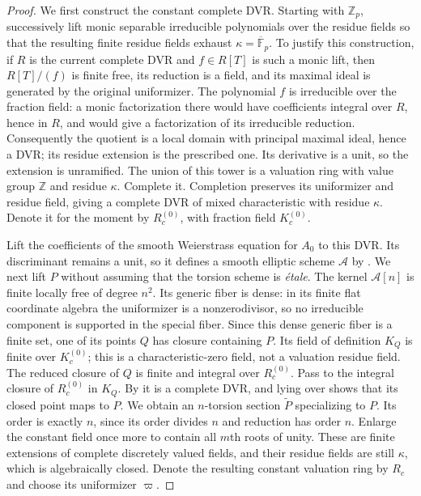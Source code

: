 \begin{proof}
We first construct the constant complete DVR.  Starting with
$\mathbb Z_p$, successively lift monic separable irreducible polynomials
over the residue fields so that the resulting finite residue fields
exhaust $\kappa=\overline{\mathbb F}_p$.  To justify this construction,
if $R$ is the current complete DVR and $f\in R[T]$ is such a monic
lift, then $R[T]/(f)$ is finite free, its reduction is a field, and its
maximal ideal is generated by the original uniformizer.  The polynomial
$f$ is irreducible over the fraction field: a monic factorization there
would have coefficients integral over $R$, hence in $R$, and would give
a factorization of its irreducible reduction.  Consequently the quotient
is a local domain with principal maximal ideal, hence a DVR; its residue
extension is the prescribed one.  Its derivative is a unit, so the
extension is unramified.  The union of this tower is a valuation ring
with value group $\mathbb Z$ and residue $\kappa$.  Complete it.  Completion
preserves its uniformizer and residue field, giving a complete DVR of
mixed characteristic with residue $\kappa$. Denote it for the moment by
$R_c^{(0)}$, with fraction field $K_c^{(0)}$.

Lift the coefficients of the smooth Weierstrass equation for $A_0$ to
this DVR.  Its discriminant remains a unit, so it defines a smooth
elliptic scheme $\mathcal A$ by .
We next lift $P$ without assuming that the torsion scheme is \emph{\'{e}tale}.
The kernel $\mathcal A[n]$ is finite locally free of degree $n^2$.
Its generic fiber is dense: in its finite flat coordinate algebra the
uniformizer is a nonzerodivisor, so no irreducible component is supported
in the special fiber. Since this dense generic fiber is a finite set,
one of its points $Q$ has closure containing $P$. Its field of definition
$K_Q$ is finite over $K_c^{(0)}$; this is a characteristic-zero field,
not a valuation residue field. The reduced closure of $Q$ is finite and
integral over $R_c^{(0)}$. Pass to the integral closure of $R_c^{(0)}$
in $K_Q$.
By  it is a complete DVR, and lying over
shows that its closed point maps to $P$.  We obtain an $n$-torsion section
$\widetilde P$ specializing to $P$.  Its order is exactly $n$, since its
order divides $n$ and reduction has order $n$.  Enlarge the constant
field once more to contain all $m$th roots of unity.  These are finite
extensions of complete discretely valued fields, and their residue
fields are still $\kappa$, which is algebraically closed.  Denote the
resulting constant valuation ring by $R_c$ and choose its uniformizer
$\varpi$.


\end{proof}
